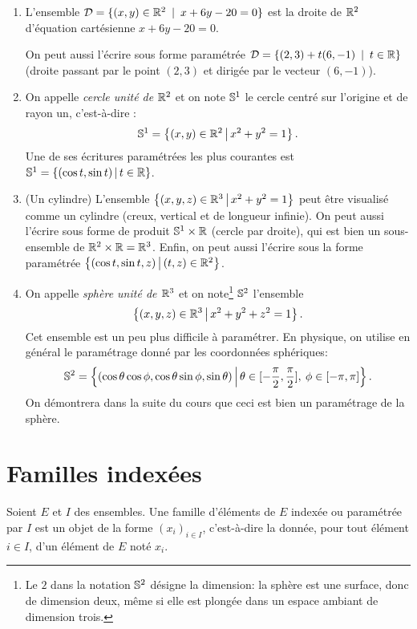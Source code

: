 \begin{exemple}
\begin{enumerate}
\item L'ensemble $\mathcal D = \{(x,y)\in \R^2\:\mid\: x+6y-20=0\}$ est la droite de $\R^2$ d'équation cartésienne $x+6y-20=0$.

On peut aussi l'écrire sous forme paramétrée $\mathcal D = \{ (2,3)+t(6,-1)\:\mid\: t\in \R\}$ (droite passant par le point $(2,3)$ et dirigée par le vecteur $(6,-1)$).
\item {} On appelle \emph{cercle unité de $\R^2$} et on note $\S^1$ le cercle centré sur l'origine et de rayon un, c'est-à-dire :
\[ \S^1=\ensemble{(x,y)\in \R^2}{x^2+y^2=1}.\]
Une de ses écritures paramétrées les plus courantes est  $\S^1=\ensemble{(\cos t,\sin t)}{t\in \R}$.
\item (Un cylindre)  L'ensemble $\ensemble{(x,y,z)\in \R^3}{x^2+y^2=1}$ peut être visualisé comme un  cylindre (\og creux, vertical et de longueur infinie\fg). On peut aussi l'écrire sous forme de produit $\S^1 \times \R$ (cercle par droite), qui est bien un sous-ensemble de $\R^2\times \R = \R^3$. Enfin, on peut aussi l'écrire sous la forme paramétrée $\ensemble{(\cos t,\sin t,z)}{(t,z)\in \R^2}$.
\item {} On appelle \emph{sphère unité de $\R^3$} et on note\footnote{Le \og $2$\fg{} dans la notation $\S^2$ désigne la \og dimension\fg{}: la sphère est une surface, donc de \og dimension\fg{} deux, même si elle est plongée dans un espace ambiant de dimension trois.} $\S^2$ l'ensemble
\[ \ensemble{(x,y,z)\in \R^3}{x^2+y^2+z^2=1}.\]
Cet ensemble est un peu plus difficile à paramétrer. En physique, on utilise en général le paramétrage donné par les coordonnées sphériques:
\[ \S^2 = \ensemble{(\cos\theta\cos\phi, \cos\theta\sin\phi, \sin\theta)}{\theta\in[-\frac{\pi}{2},\frac{\pi}{2}], \: \phi \in [-\pi,\pi]}.\]
On démontrera dans la suite du cours que ceci est bien un paramétrage de la sphère.
\end{enumerate}
\end{exemple}



\section{Familles indexées}

\begin{definition}
Soient $E$ et $I$ des ensembles. Une famille d'éléments de $E$ indexée ou paramétrée par $I$ est un objet de la forme $(x_i)_{i\in I}$, c'est-à-dire la donnée, pour tout élément $i\in I$, d'un élément de $E$ noté $x_i$.
\end{definition}


